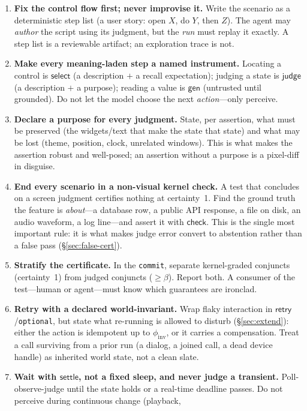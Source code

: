 \documentclass[acmsmall,screen,nonacm]{acmart}
\newcommand{\gen}{\mathsf{gen}}
\newcommand{\checkk}{\mathsf{check}}
\newcommand{\judge}{\mathsf{judge}}
\newcommand{\retry}{\mathsf{retry}}
\newcommand{\select}{\mathsf{select}}
\newcommand{\settle}{\mathsf{settle}}
\theoremstyle{acmdefinition}%
\theoremstyle{acmplain}%
\begin{document}
\begin{enumerate}
\item \textbf{Fix the control flow first; never improvise it.} Write the
scenario as a deterministic step list (a user story: open $X$, do $Y$,
then $Z$). The agent may \emph{author} the script using its judgment, but
the \emph{run} must replay it exactly. A step list is a reviewable
artifact; an exploration trace is not.
\item \textbf{Make every meaning-laden step a named instrument.} Locating
a control is $\select$ (a description $+$ a recall expectation); judging a
state is $\judge$ (a description $+$ a purpose); reading a value is
$\gen$ (untrusted until grounded). Do not let the model choose the next
\emph{action}---only perceive.
\item \textbf{Declare a purpose for every judgment.} State, per assertion,
what must be preserved (the widgets/text that make the state that state)
and what may be lost (theme, position, clock, unrelated windows). This is
what makes the assertion robust and well-posed; an assertion without a
purpose is a pixel-diff in disguise.
\item \textbf{End every scenario in a non-visual kernel check.} A test
that concludes on a screen judgment certifies nothing at certainty~1.
Find the ground truth the feature is \emph{about}---a database row, a
public API response, a file on disk, an audio waveform, a log line---and
assert it with $\checkk$. This is the single most important rule: it is
what makes judge error convert to abstention rather than a false pass
(\S\ref{sec:false-cert}).
\item \textbf{Stratify the certificate.} In the \texttt{commit}, separate
kernel-graded conjuncts (certainty~1) from judged conjuncts
($\ge\beta$). Report both. A consumer of the test---human or agent---must
know which guarantees are ironclad.
\item \textbf{Retry with a declared world-invariant.} Wrap flaky
interaction in $\retry$/\texttt{optional}, but state what re-running is
allowed to disturb (\S\ref{sec:extend}): either the action is idempotent
up to $\phi_{\mathrm{inv}}$, or it carries a compensation. Treat a call
surviving from a prior run (a dialog, a joined call, a dead device
handle) as inherited world state, not a clean slate.
\item \textbf{Wait with $\settle$, not a fixed sleep, and never judge a
transient.} Poll-observe-judge until the state holds or a real-time
deadline passes. Do not perceive during continuous change (playback,

\end{enumerate}
\end{document}
